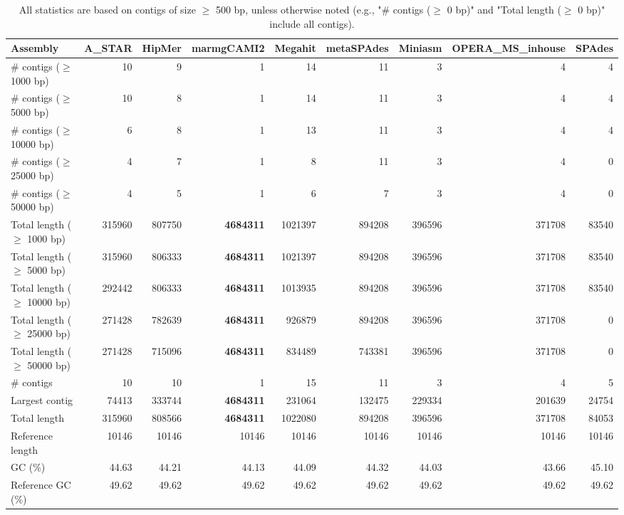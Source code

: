 \documentclass[12pt,a4paper]{article}
\begin{document}
\begin{table}[ht]
\begin{center}
\caption{All statistics are based on contigs of size $\geq$ 500 bp, unless otherwise noted (e.g., "\# contigs ($\geq$ 0 bp)" and "Total length ($\geq$ 0 bp)" include all contigs).}
\begin{tabular}{|l*{8}{|r}|}
\hline
Assembly & A\_STAR & HipMer & marmgCAMI2 & Megahit & metaSPAdes & Miniasm & OPERA\_MS\_inhouse & SPAdes \\ \hline
\# contigs ($\geq$ 1000 bp) & 10 & 9 & 1 & 14 & 11 & 3 & 4 & 4 \\ \hline
\# contigs ($\geq$ 5000 bp) & 10 & 8 & 1 & 14 & 11 & 3 & 4 & 4 \\ \hline
\# contigs ($\geq$ 10000 bp) & 6 & 8 & 1 & 13 & 11 & 3 & 4 & 4 \\ \hline
\# contigs ($\geq$ 25000 bp) & 4 & 7 & 1 & 8 & 11 & 3 & 4 & 0 \\ \hline
\# contigs ($\geq$ 50000 bp) & 4 & 5 & 1 & 6 & 7 & 3 & 4 & 0 \\ \hline
Total length ($\geq$ 1000 bp) & 315960 & 807750 & {\bf 4684311} & 1021397 & 894208 & 396596 & 371708 & 83540 \\ \hline
Total length ($\geq$ 5000 bp) & 315960 & 806333 & {\bf 4684311} & 1021397 & 894208 & 396596 & 371708 & 83540 \\ \hline
Total length ($\geq$ 10000 bp) & 292442 & 806333 & {\bf 4684311} & 1013935 & 894208 & 396596 & 371708 & 83540 \\ \hline
Total length ($\geq$ 25000 bp) & 271428 & 782639 & {\bf 4684311} & 926879 & 894208 & 396596 & 371708 & 0 \\ \hline
Total length ($\geq$ 50000 bp) & 271428 & 715096 & {\bf 4684311} & 834489 & 743381 & 396596 & 371708 & 0 \\ \hline
\# contigs & 10 & 10 & 1 & 15 & 11 & 3 & 4 & 5 \\ \hline
Largest contig & 74413 & 333744 & {\bf 4684311} & 231064 & 132475 & 229334 & 201639 & 24754 \\ \hline
Total length & 315960 & 808566 & {\bf 4684311} & 1022080 & 894208 & 396596 & 371708 & 84053 \\ \hline
Reference length & 10146 & 10146 & 10146 & 10146 & 10146 & 10146 & 10146 & 10146 \\ \hline
GC (\%) & 44.63 & 44.21 & 44.13 & 44.09 & 44.32 & 44.03 & 43.66 & 45.10 \\ \hline
Reference GC (\%) & 49.62 & 49.62 & 49.62 & 49.62 & 49.62 & 49.62 & 49.62 & 49.62 \\ \hline

\end{tabular}
\end{center}
\end{table}
\end{document}

